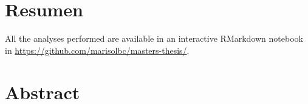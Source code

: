 \chapter*{Resumen}
\textcolor{lightgray}{\lipsum[1-2]}

All the analyses performed are available in an interactive RMarkdown notebook in \url{https://github.com/marisolbc/masters-thesis/}.

\chapter*{Abstract}
\textcolor{lightgray}{\lipsum[1-2]}
